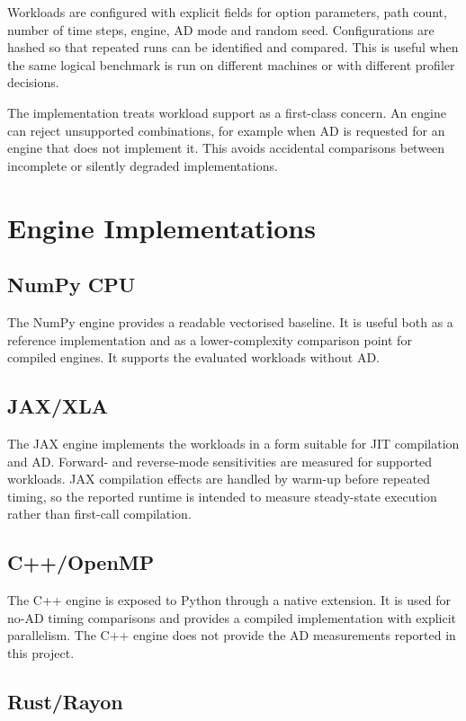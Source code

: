 Workloads are configured with explicit fields for option parameters, path count, number of time steps, engine, AD mode and random seed. Configurations are hashed so that repeated runs can be identified and compared. This is useful when the same logical benchmark is run on different machines or with different profiler decisions.

The implementation treats workload support as a first-class concern. An engine can reject unsupported combinations, for example when AD is requested for an engine that does not implement it. This avoids accidental comparisons between incomplete or silently degraded implementations.

\section{Engine Implementations}

\subsection{NumPy CPU}

The NumPy engine provides a readable vectorised baseline. It is useful both as a reference implementation and as a lower-complexity comparison point for compiled engines. It supports the evaluated workloads without AD.

\subsection{JAX/XLA}

The JAX engine implements the workloads in a form suitable for JIT compilation and AD. Forward- and reverse-mode sensitivities are measured for supported workloads. JAX compilation effects are handled by warm-up before repeated timing, so the reported runtime is intended to measure steady-state execution rather than first-call compilation.

\subsection{C++/OpenMP}

The C++ engine is exposed to Python through a native extension. It is used for no-AD timing comparisons and provides a compiled implementation with explicit parallelism. The C++ engine does not provide the AD measurements reported in this project.

\subsection{Rust/Rayon}

